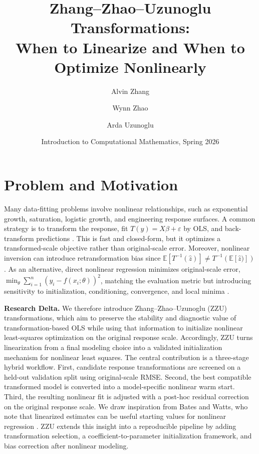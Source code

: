 \documentclass[11pt]{article}
\title{\vspace{-2.5em}\textbf{Zhang--Zhao--Uzunoglu Transformations:\\ When to Linearize and When to Optimize Nonlinearly}}
\author{Alvin Zhang \and Wynn Zhao \and Arda Uzunoglu}
\date{Introduction to Computational Mathematics, Spring 2026}
\begin{document}
\maketitle
\vspace{-3.0em}

\section{Problem and Motivation}
\label{intro}
Many data-fitting problems involve nonlinear relationships, such as exponential growth, saturation, logistic growth, and engineering response surfaces. A common strategy is to transform the response, fit $T(y)=X\beta+\varepsilon$ by OLS, and back-transform predictions \cite{BoxCox1964,YeoJohnson2000,CarrollRuppert1988}. This is fast and closed-form, but it optimizes a transformed-scale objective rather than original-scale error. Moreover, nonlinear inversion can introduce retransformation bias since $\mathbb{E}[T^{-1}(\widehat{z})]\neq T^{-1}(\mathbb{E}[\widehat{z})])$ \cite{Duan1983,CarrollRuppert1988}. As an alternative, direct nonlinear regression minimizes original-scale error,
$\min_{\theta}\sum_{i=1}^{n}(y_i-f(x_i;\theta))^2$, matching the evaluation metric but introducing sensitivity to initialization, conditioning, convergence, and local minima \cite{BatesWatts1988,NocedalWright2006}.

\textbf{Research Delta.} We therefore introduce Zhang--Zhao--Uzunoglu (ZZU) transformations, which aim to preserve the stability and diagnostic value of transformation-based OLS while using that information to initialize nonlinear least-squares optimization on the original response scale. Accordingly, ZZU turns linearization from a final modeling choice into a validated initialization mechanism for nonlinear least squares. The central contribution is a three-stage hybrid workflow. First, candidate response transformations are screened on a held-out validation split using original-scale RMSE. Second, the best compatible transformed model is converted into a model-specific nonlinear warm start. Third, the resulting nonlinear fit is adjusted with a post-hoc residual correction on the original response scale. We draw inspiration from Bates and Watts, who note that linearized estimates can be useful starting values for nonlinear regression \cite{BatesWatts1988}. ZZU extends this insight into a reproducible pipeline by adding transformation selection, a coefficient-to-parameter initialization framework, and bias correction after nonlinear modeling.
\end{document}
